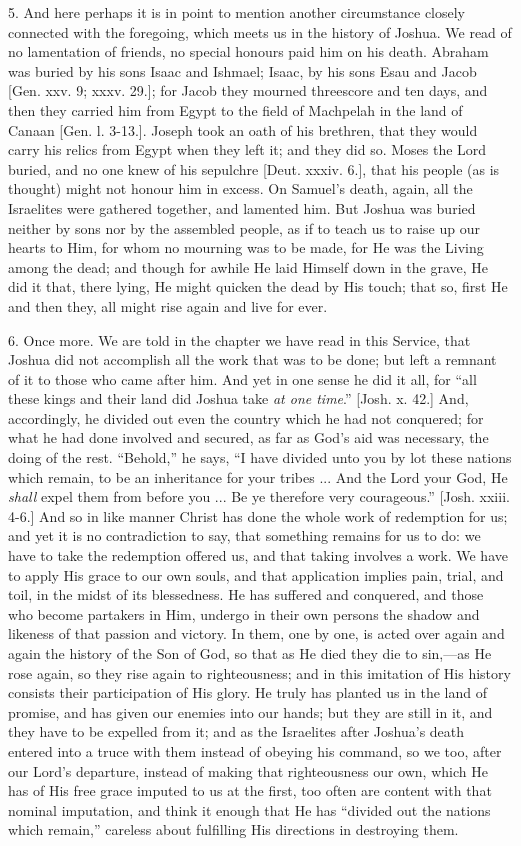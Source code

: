 5. And here perhaps it is in point to mention another circumstance
closely connected with the foregoing, which meets us in the history of
Joshua. We read of no lamentation of friends, no special honours paid
him on his death. Abraham was buried by his sons Isaac and Ishmael;
Isaac, by his sons Esau and Jacob [Gen. xxv. 9; xxxv. 29.]; for Jacob
they mourned threescore and ten days, and then they carried him from
Egypt to the field of Machpelah in the land of Canaan [Gen. l. 3-13.].
Joseph took an oath of his brethren, that they would carry his relics
from Egypt when they left it; and they did so. Moses the Lord buried,
and no one knew of his sepulchre [Deut. xxxiv. 6.], that his people
(as is thought) might not honour him in excess. On Samuel's death,
again, all the Israelites were gathered together, and lamented him.
But Joshua was buried neither by sons nor by the assembled people, as
if to teach us to raise up our hearts to Him, for whom no mourning was
to be made, for He was the Living among the dead; and though for
awhile He laid Himself down in the grave, He did it that, there lying,
He might quicken the dead by His touch; that so, first He and then
they, all might rise again and live for ever.

6. Once more. We are told in the chapter we have read in this
Service, that Joshua did not accomplish all the work that was to be
done; but left a remnant of it to those who came after him. And yet in
one sense he did it all, for ``all these kings and their land did
Joshua take \emph{at one time}.'' [Josh. x. 42.] And, accordingly,
he divided out even the country which he had not conquered; for what
he had done involved and secured, as far as God's aid was necessary,
the doing of the rest. ``Behold,'' he says, ``I have
divided unto you by lot these nations which remain, to be an
inheritance for your tribes ... And the Lord your God, He \emph{shall} expel
them from before you ... Be ye therefore very courageous.'' [Josh.
xxiii. 4-6.] And so in like manner Christ has done the whole work of
redemption for us; and yet it is no contradiction to say, that
something remains for us to do: we have to take the redemption offered
us, and that taking involves a work. We have to apply His grace to our
own souls, and that application implies pain, trial, and toil, in the
midst of its blessedness. He has suffered and conquered, and those who
become partakers in Him, undergo in their own persons the shadow and
likeness of that passion and victory. In them, one by one, is acted
over again and again the history of the Son of God, so that as He died
they die to sin,—as He rose again, so they rise again to
righteousness; and in this imitation of His history consists their
participation of His glory. He truly has planted us in the land of
promise, and has given our enemies into our hands; but they are still
in it, and they have to be expelled from it; and as the Israelites
after Joshua's death entered into a truce with them instead of obeying
his command, so we too, after our Lord's departure, instead of making
that righteousness our own, which He has of His free grace imputed to
us at the first, too often are content with that nominal imputation,
and think it enough that He has ``divided out the nations which
remain,'' careless about fulfilling His directions in destroying
them.

